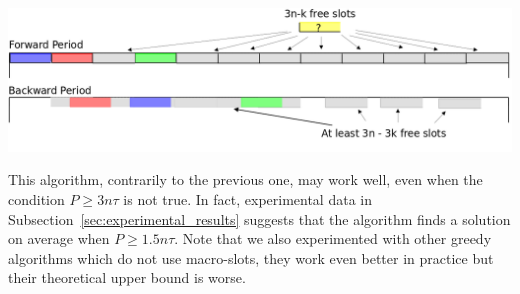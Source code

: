 \documentclass[a4paper,10pt]{article}
\begin{document}
      \begin{center}
      \includegraphics[scale=0.3]{ex3nt.png}
      \end{center}
% 
% 
% 
	
This algorithm, contrarily to the previous one, may work well, even when the condition $P \geq 3n\tau$ is not true.
In fact, experimental data in Subsection~\ref{sec:experimental_results} suggests that the algorithm finds a solution on average when $P \geq 1.5 n\tau$.
Note that we also experimented with other greedy algorithms which do not use macro-slots, they work even better in practice but their theoretical upper bound is worse.
\end{document}
